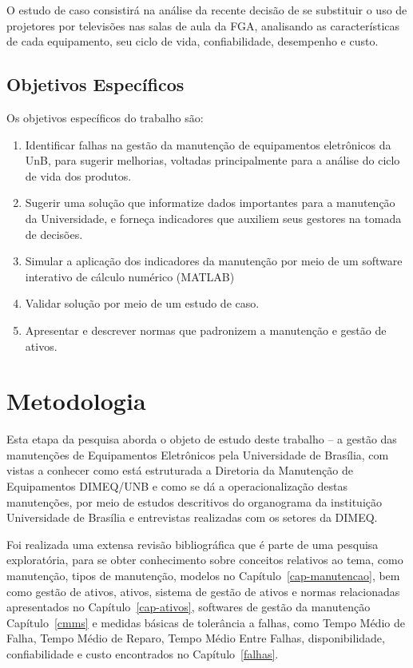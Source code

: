O estudo de caso consistirá na análise da recente decisão de se substituir o uso de projetores por televisões nas salas de aula da FGA, analisando as características de cada equipamento, seu ciclo de vida, confiabilidade, desempenho e custo.



\section{Objetivos Específicos}

Os objetivos específicos do trabalho são:

\begin{enumerate}
	\item Identificar falhas na gestão da manutenção de equipamentos eletrônicos da UnB, para sugerir melhorias, voltadas principalmente para a análise do ciclo de vida dos produtos.
	\item Sugerir uma solução que informatize dados importantes para a manutenção da Universidade, e forneça indicadores que auxiliem seus gestores na tomada de decisões.
	\item Simular a aplicação dos indicadores da manutenção por meio de um software interativo de cálculo numérico (MATLAB) 
	\item Validar solução por meio de um estudo de caso.
	\item Apresentar e descrever normas que padronizem a manutenção e gestão de ativos.
\end{enumerate}

%

\chapter{Metodologia}

Esta etapa da pesquisa aborda o objeto de estudo deste trabalho – a gestão das manutenções de Equipamentos Eletrônicos pela Universidade de Brasília, com vistas a conhecer como está estruturada a Diretoria da Manutenção de Equipamentos DIMEQ/UNB e como se dá a operacionalização destas manutenções, por meio de estudos descritivos do organograma da instituição Universidade de Brasília e entrevistas realizadas com os setores da DIMEQ.

Foi realizada uma extensa revisão bibliográfica que é parte de uma pesquisa exploratória, para se obter conhecimento sobre conceitos relativos ao tema, como manutenção, tipos de manutenção, modelos no Capítulo~\ref{cap-manutencao}, bem como gestão de ativos, ativos, sistema de gestão de ativos e normas relacionadas apresentados no Capítulo~\ref{cap-ativos}, softwares de gestão da manutenção Capítulo~\ref{cmms} e medidas básicas de tolerância a falhas, como  Tempo Médio de Falha, Tempo Médio de Reparo, Tempo Médio Entre Falhas, disponibilidade, confiabilidade e custo encontrados no Capítulo~\ref{falhas}.

